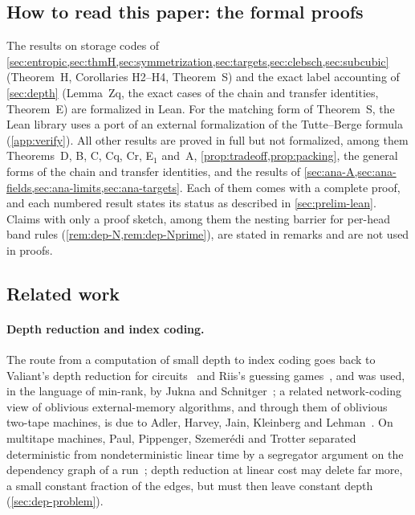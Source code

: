 \subsection{How to read this paper: the formal proofs}

The results on storage codes of \cref{sec:entropic,sec:thmH,sec:symmetrization,sec:targets,sec:clebsch,sec:subcubic}
(Theorem~H, Corollaries H2--H4, Theorem~S) and the exact label accounting of \cref{sec:depth} (Lemma~Zq, the exact cases of
the chain and transfer identities, Theorem~E) are formalized in Lean. For the matching form of Theorem~S, the Lean library uses a port of an external
formalization of the Tutte--Berge formula (\cref{app:verify}). All other results are proved in full but not
formalized, among them Theorems~D, B, C, Cq, Cr, E$_1$ and~A, \cref{prop:tradeoff,prop:packing}, the general forms of the
chain and transfer identities, and the results of \cref{sec:ana-A,sec:ana-fields,sec:ana-limits,sec:ana-targets}. Each of them comes with a
complete proof, and each numbered result states its status as described in \cref{sec:prelim-lean}. Claims with
only a proof sketch, among them the nesting barrier for per-head band rules (\cref{rem:dep-N,rem:dep-Nprime}), are stated
in remarks and are not used in proofs.

\subsection{Related work}

\paragraph{Depth reduction and index coding.} The route from a computation of small depth to index coding goes back to
Valiant's depth reduction for circuits~\cite{Valiant1977} and Riis's guessing games~\cite{Riis2007}, and was used, in the language of
min-rank, by Jukna and Schnitger~\cite{JuknaSchnitger2011}; a related network-coding view of oblivious external-memory
algorithms, and through them of oblivious two-tape machines, is due to Adler, Harvey, Jain, Kleinberg and
Lehman~\cite[Section~6, Theorems~6.2 and~6.3]{AHJKL2006}. On multitape machines, Paul, Pippenger, Szemerédi and Trotter separated deterministic
from nondeterministic linear time by a segregator argument on the dependency graph of a run~\cite{PPST1983}; depth
reduction at linear cost may delete far more, a small constant fraction of the edges, but must then leave constant
depth (\cref{sec:dep-problem}).

